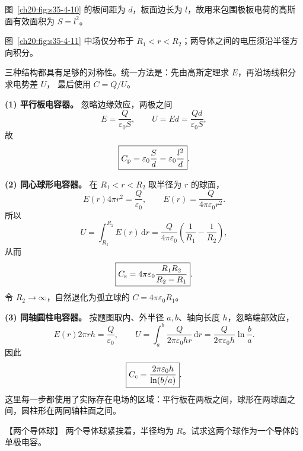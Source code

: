 {图~\ref{ch20:fig:s35-4-10} 的板间距为 $d$，板面边长为 $l$，故用来包围极板电荷的高斯面有效面积为 $S=l^2$。

\par\noindent\begin{minipage}{\linewidth}
\exampleParallelFigure
{}\label{ch20:fig:s35-4-10}
\end{minipage}\par\medskip

图~\ref{ch20:fig:s35-4-11} 中场仅分布于 $R_1<r<R_2$；两导体之间的电压须沿半径方向积分。

\par\noindent\begin{minipage}{\linewidth}
\exampleSphericalFigure
{}\label{ch20:fig:s35-4-11}
\end{minipage}\par\medskip

\begin{xesolution}
\ThACapacitors

三种结构都具有足够的对称性。统一方法是：先由高斯定理求 $E$，再沿场线积分求电势差 $U$，
最后使用 $C=Q/U$。

\textbf{(1) 平行板电容器。} 忽略边缘效应，两极之间
\[
 E=\frac{Q}{\varepsilon_0S},\qquad U=Ed=\frac{Qd}{\varepsilon_0S},
\]
故
\[
 \boxed{C_{\rm p}=\varepsilon_0\frac Sd=\varepsilon_0\frac{l^2}{d}}.
\]

\textbf{(2) 同心球形电容器。} 在 $R_1<r<R_2$ 取半径为 $r$ 的球面，
\[
 E(r)4\pi r^2=\frac Q{\varepsilon_0},\qquad
 E(r)=\frac{Q}{4\pi\varepsilon_0r^2}.
\]
所以
\[
 U=\int_{R_1}^{R_2}E(r)\,\mathrm dr
 =\frac{Q}{4\pi\varepsilon_0}\left(\frac1{R_1}-\frac1{R_2}\right),
\]
从而
\[
 \boxed{C_{\rm s}=4\pi\varepsilon_0\frac{R_1R_2}{R_2-R_1}}.
\]
令 $R_2\to\infty$，自然退化为孤立球的 $C=4\pi\varepsilon_0R_1$。

\textbf{(3) 同轴圆柱电容器。} 按题图取内、外半径 $a,b$、轴向长度 $h$，忽略端部效应，
\[
 E(r)2\pi rh=\frac Q{\varepsilon_0},\qquad
 U=\int_{a}^{b}\frac{Q}{2\pi\varepsilon_0hr}\,\mathrm dr
 =\frac{Q}{2\pi\varepsilon_0h}\ln\frac{b}{a}.
\]
因此
\[
 \boxed{C_{\rm c}=\frac{2\pi\varepsilon_0h}{\ln(b/a)}}.
\]
这里每一步都使用了实际存在电场的区域：平行板在两板之间，球形在两球面之间，圆柱形在两同轴柱面之间。
\end{xesolution}



\begin{origexamplebox}{【两个导体球】}\label{ch20:ex:s35-4-2}
两个导体球紧挨着，半径均为 $R$。试求这两个球作为一个导体的单极电容。
\par\noindent\begin{minipage}{\linewidth}
\touchingSpheresFigure
{}\label{ch20:fig:s35-4-12}
\end{minipage}\par\medskip
\end{origexamplebox}\par\nopagebreak[4]

}
